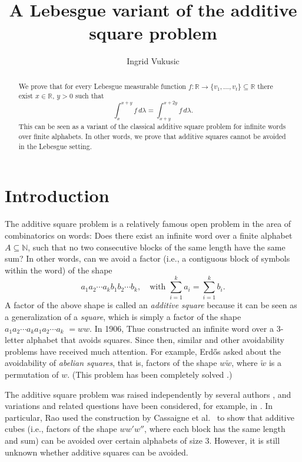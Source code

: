 \documentclass{amsart}
\title[Lebesgue additive square problem]{A Lebesgue variant of the additive square problem}
\author[I. Vukusic]{Ingrid Vukusic}
\theoremstyle{plain}
\newcommand{\N}{\mathbb{N}}
\newcommand{\R}{\mathbb{R}}
\begin{document}
\begin{abstract}
We prove that for every Lebesgue measurable function $f \colon \R \to \{v_1, \ldots, v_t\} \subseteq \R$ there exist $x \in \R$, $y>0$ such that 
\[
    \int_x^{x+y} f\, d \lambda   
    = \int_{x+y}^{x+2y} f\, d \lambda.
\]
This can be seen as a variant of the classical additive square problem for infinite words over finite alphabets. In other words, we prove that additive squares cannot be avoided in the Lebesgue setting.  
\end{abstract}

\maketitle

\section{Introduction}

The additive square problem is a relatively famous open problem in the area of combinatorics on words:
Does there exist an infinite word 
over a finite alphabet $A\subseteq \N$, such that no two consecutive blocks of the same length have the same sum? 
In other words, can we avoid a factor (i.e., a contiguous block of symbols within the word) of the shape
\[
    a_1 a_2 \cdots a_k b_1 b_2 \cdots b_k,
    \quad \text{with }
    \sum_{i = 1}^k a_i = \sum_{i = 1}^k b_i.
\]
A factor of the above shape is called an \textit{additive square} because it can be seen as a generalization of a \textit{square}, which is simply a factor of the shape $a_1 a_2 \cdots a_ka_1 a_2 \cdots a_k$ $= ww$.
In 1906, Thue \cite{Thue1906} constructed an infinite word over a 3-letter alphabet that avoids squares.
Since then, similar and other avoidability problems have received much attention.
For example, Erd\H{o}s \cite{Erdos1961} asked about the avoidability of \textit{abelian squares}, that is, factors of the shape $w \widetilde{w}$, where $\widetilde{w}$ is a permutation of $w$. (This problem has been completely solved \cite{Keranen1992}.)

The additive square problem was raised independently by several authors \cite{BrownFreedman1987, PirilloVarricchio1994, HalbeisenHungerbuhler2000}, and variations and related questions have been considered, for example, in \cite{ArdalBrownJungicVeselin2012, AuRobertsonShallit2011, Brown2012, DuMousaviRowlandSchaefferShallit2017}.
In particular, Rao \cite{Rao2015} used the construction by Cassaigne et al.\ \cite{CassaigneCurrieSchaefferShallit2014} to show that additive cubes (i.e., factors of the shape $ww'w''$, where each block has the same length and sum) can be avoided over certain alphabets of size 3. However, it is still unknown whether additive squares can be avoided.
\end{document}
